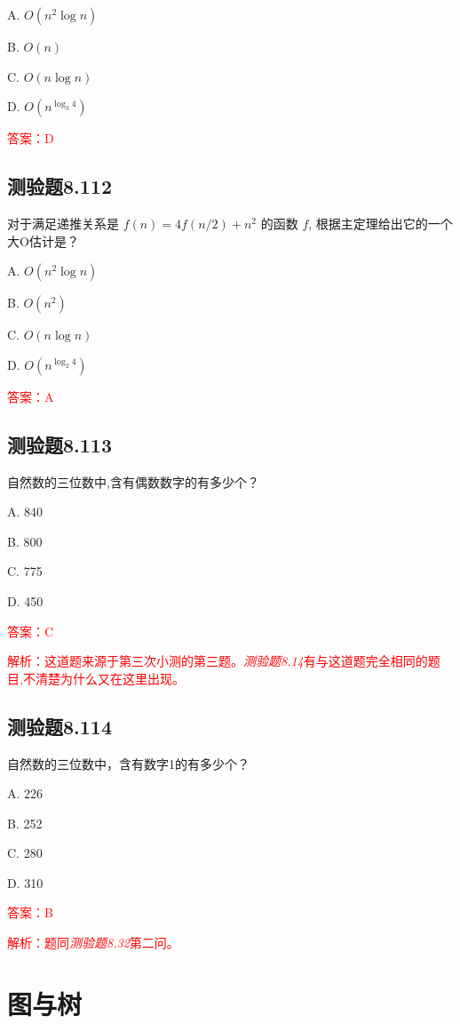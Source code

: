 \documentclass[UTF8, heading=true]{ctexart}
\begin{document}
A. $O\left(n^2 \log n\right)$

B. $O(n)$

C. $O(n \log n)$

D. $O\left(n^{\log _3 4}\right)$

\textcolor{red}{答案：D}

\subsection{测验题8.112}

对于满足递推关系是 $f(n)=4 f(n / 2)+n^2$ 的函数 $f$, 根据主定理给出它的一个大O估计是？

A. $O\left(n^2 \log n\right)$

B. $O\left(n^2\right)$

C. $O(n \log n)$

D. $O\left(n^{\log _2 4}\right)$

\textcolor{red}{答案：A}

\subsection{测验题8.113}

自然数的三位数中,含有偶数数字的有多少个？

A. 840

B. 800

C. 775

D. 450

\textcolor{red}{答案：C}

\textcolor{red}{解析：这道题来源于第三次小测的第三题。\textit{测验题8.14}有与这道题完全相同的题目,不清楚为什么又在这里出现。}


\subsection{测验题8.114}

自然数的三位数中，含有数字1的有多少个？

A. 226

B. 252

C. 280

D. 310

\textcolor{red}{答案：B}

\textcolor{red}{解析：题同\textit{测验题8.32}第二问。}

\clearpage

\section{图与树}
\end{document}
